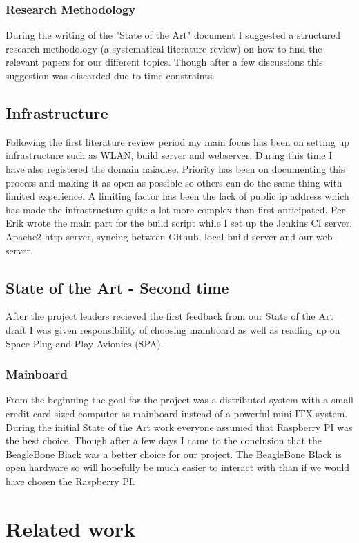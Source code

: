 \subsubsection{Research Methodology}
During the writing of the "State of the Art" document I suggested a structured
research methodology (a systematical literature review) on how to find the relevant
papers for our different topics. Though after a few discussions this
suggestion was discarded due to time constraints.

\subsection{Infrastructure}
Following the first literature review period my main focus has been on setting
up infrastructure such as WLAN, build server and webserver. During this time
I have also registered the domain naiad.se. Priority has been
on documenting this process and making it as open as possible so others can do
the same thing with limited experience.
A limiting factor has been the lack of public ip address which has
made the infrastructure quite a lot more complex than first anticipated.
Per-Erik wrote the main part for the build script while I set up the Jenkins
CI server, Apache2 http server, syncing between Github, local build server and our web
server.

\subsection{State of the Art - Second time}
After the project leaders recieved the first feedback from our State of the Art
draft I was given responsibility of choosing mainboard as well as reading up on
Space Plug-and-Play Avionics (SPA).

\subsubsection{Mainboard}
From the beginning the goal for the project was a distributed system with a
small credit card sized computer as mainboard instead of a powerful mini-ITX
system. During the initial State of the Art work everyone assumed that
Raspberry PI was the best choice. Though after a few days I came to the
conclusion that the BeagleBone Black was a better choice for our project.
The BeagleBone Black is open hardware so will hopefully be much easier to
interact with than if we would have chosen the Raspberry PI.

\section{Related work}

